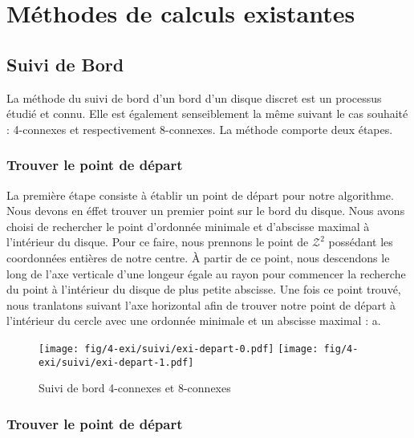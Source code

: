 \section{Méthodes de calculs existantes}

\subsection{Suivi de Bord}

La méthode du suivi de bord d'un bord d'un disque discret est un processus étudié et connu. Elle est également senseiblement la même suivant le cas souhaité : 4-connexes et respectivement 8-connexes. La méthode comporte deux étapes. 

\subsubsection{Trouver le point de départ}

La première étape consiste à établir un point de départ pour notre algorithme. Nous devons en éffet trouver un premier point sur le bord du disque. Nous avons choisi de rechercher le point d'ordonnée minimale et d'abscisse maximal à l'intérieur du disque. Pour ce faire, nous prennons le point de $\mathcal{Z}^2$ possédant les coordonnées entières de notre centre. À partir de ce point, nous descendons le long de l'axe verticale d'une longeur égale au rayon pour commencer la recherche du point à l'intérieur du disque de plus petite abscisse. Une fois ce point trouvé, nous tranlatons suivant l'axe horizontal afin de trouver notre point de départ à l'intérieur du cercle avec une ordonnée minimale et un abscisse maximal : a. 

\begin{figure}[h!]
  \centering
  \texttt{[image: fig/4-exi/suivi/exi-depart-0.pdf]}
  \texttt{[image: fig/4-exi/suivi/exi-depart-1.pdf]}
  \caption{Suivi de bord 4-connexes et 8-connexes}
\end{figure}
  

\subsubsection{Trouver le point de départ}


